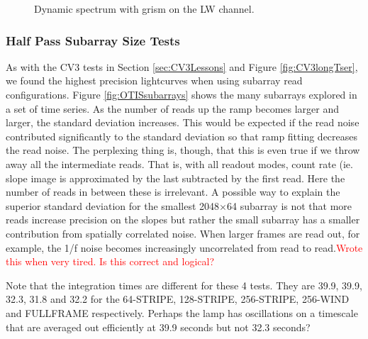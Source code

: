 \documentclass{aastex62}
\begin{document}
\begin{figure}
\caption{Dynamic spectrum with grism on the LW channel.
}\label{fig:otisLWdynSpec}
\end{figure}



\clearpage

\subsubsection{Half Pass Subarray Size Tests}

As with the CV3 tests in Section \ref{sec:CV3Lessons} and Figure \ref{fig:CV3longTser}, we found the highest precision lightcurves when using subarray read configurations.
Figure \ref{fig:OTISsubarrays} shows the many subarrays explored in a set of time series.
As the number of reads up the ramp becomes larger and larger, the standard deviation increases.
This would be expected if the read noise contributed significantly to the standard deviation so that ramp fitting decreases the read noise.
The perplexing thing is, though, that this is even true if we throw away all the intermediate reads.
That is, with all readout modes, count rate (ie. slope image is approximated by the last subtracted by the first read.
Here the number of reads in between these is irrelevant.
A possible way to explain the superior standard deviation for the smallest 2048$\times$64 subarray is not that more reads increase precision on the slopes but rather the small subarray has a smaller contribution from spatially correlated noise.
When larger frames are read out, for example, the 1/f noise becomes increasingly uncorrelated from read to read.\textcolor{red}{Wrote this when very tired. Is this correct and logical?}

Note that the integration times are different for these 4 tests. They are 39.9, 39.9, 32.3, 31.8 and 32.2 for the 64-STRIPE, 128-STRIPE, 256-STRIPE, 256-WIND and FULLFRAME respectively. Perhaps the lamp has oscillations on a timescale that are averaged out efficiently at 39.9 seconds but not 32.3 seconds?
\end{document}
